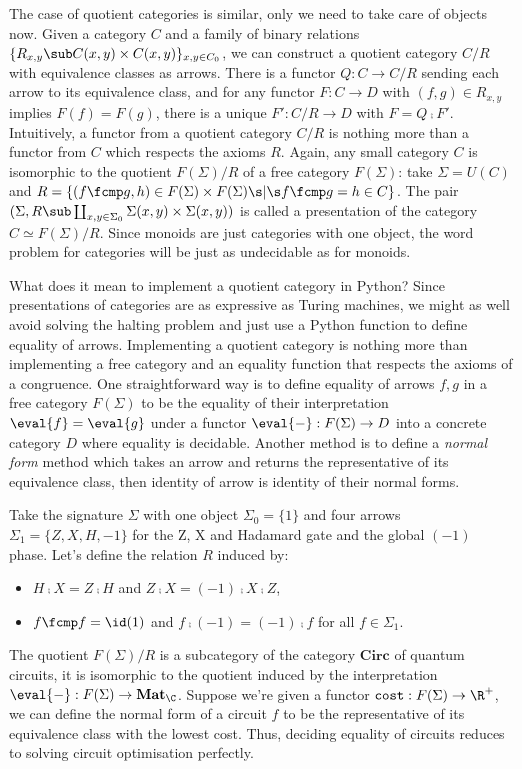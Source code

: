 The case of quotient categories is similar, only we need to take care of objects now.
Given a category $C$ and a family of binary relations $\{ R_{x,y} \sub C(x, y) \times C(x, y) \}_{x, y \in C_0}$, we can construct a quotient category $C / R$ with equivalence classes as arrows.
There is a functor $Q : C \to C / R$ sending each arrow to its equivalence class, and for any functor $F : C \to D$ with $(f, g) \in R_{x, y}$ implies $F(f) = F(g)$,
there is a unique $F' : C / R \to D$ with $F = Q \fcmp F'$.
Intuitively, a functor from a quotient category $C / R$ is nothing more than a functor from $C$ which respects the axioms $R$.
Again, any small category $C$ is isomorphic to the quotient $F(\Sigma) / R$ of a free category $F(\Sigma)$: take $\Sigma = U(C)$ and $R = \{ (f \fcmp g, h) \in F(\Sigma) \times F(\Sigma) \s \vert \s f \fcmp g = h \in C \}$.
The pair $(\Sigma, R \sub \coprod_{x, y \in \Sigma_0} \Sigma(x, y) \times \Sigma(x, y))$ is called a presentation of the category $C \simeq F(\Sigma) / R$.
Since monoids are just categories with one object, the word problem for categories will be just as undecidable as for monoids.

What does it mean to implement a quotient category in Python?
Since presentations of categories are as expressive as Turing machines, we might as well avoid solving the halting problem and just use a Python function to define equality of arrows.
Implementing a quotient category is nothing more than implementing a free category and an equality function that respects the axioms of a congruence.
One straightforward way is to define equality of arrows $f, g$ in a free category $F(\Sigma)$ to be the equality of their interpretation $\eval{f} = \eval{g}$ under a functor $\eval{-} : F(\Sigma) \to D$ into a concrete category $D$ where equality is decidable.
Another method is to define a \emph{normal form} method which takes an arrow and returns the representative of its equivalence class, then identity of arrow is identity of their normal forms.

\begin{example} \label{example:1-qubit-presentation}
Take the signature $\Sigma$ with one object $\Sigma_0 = \{ 1 \}$ and four arrows $\Sigma_1  = \{ Z, X, H, -1 \}$ for the Z, X and Hadamard gate and the global $(-1)$ phase.
Let's define the relation $R$ induced by:
\begin{itemize}
    \item $H \fcmp X = Z \fcmp H$ and $Z \fcmp X = (-1) \fcmp X \fcmp Z$,
    \item $f \fcmp f = \id(1)$ and $f \fcmp (-1) = (-1) \fcmp f$ for all $f \in \Sigma_1$.
\end{itemize}
The quotient $F(\Sigma) / R$ is a subcategory of the category $\mathbf{Circ}$ of quantum circuits, it is isomorphic to the quotient induced by the interpretation $\eval{-} : F(\Sigma) \to \mathbf{Mat}_\C$.
Suppose we're given a functor $\mathtt{cost} : F(\Sigma) \to \R^+$, we can define the normal form of a circuit $f$ to be the representative of its equivalence class with the lowest cost.
Thus, deciding equality of circuits reduces to solving circuit optimisation perfectly.
\end{example}

